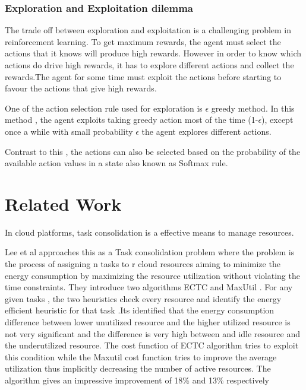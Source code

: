 \documentclass[a4paper,12pt]{Classes/RoboticsLaTeX}
\begin{document}
    \subsection{Exploration and Exploitation dilemma}
    The trade off between exploration and exploitation is a challenging problem in reinforcement learning. To get maximum rewards, the agent must select the actions that it knows will produce high rewards. However in order to know which actions do drive high rewards, it has to  explore different actions and collect the rewards.The agent for some time must exploit the actions before starting to favour the actions that give high rewards. 

    One of the action selection rule used for exploration  is $\epsilon$ greedy method. In this method , the agent exploits taking  greedy action most of the time (1-$\epsilon$), except once a while with small probability $\epsilon$ the agent explores different actions.

    Contrast to this , the actions can also be selected  based on the probability of the available action values in a state also known as Softmax rule.

    \chapter{Related Work}
    \label{chap:rel_work}

    In cloud platforms, task consolidation is a effective means to manage resources.
    
    Lee et al \cite{lee2012energy} approaches this as a Task consolidation problem where the problem is the process of assigning n tasks to r cloud resources aiming to minimize the energy consumption by maximizing the resource utilization without violating the time constraints.
    They introduce two algorithms ECTC and MaxUtil . For any given tasks , the two heuristics check every resource and identify the energy efficient heuristic for that task .Its identified that the energy consumption difference between lower unutilized resource  and the higher utilized resource is not very significant and the difference is very high  between and idle resource and the underutilized resource. The cost function of ECTC algorithm tries to exploit this condition while the Maxutil cost function tries to improve the average utilization thus implicitly decreasing the number of active resources. The algorithm gives an impressive improvement of 18\% and 13\% respectively
    
\end{document}
